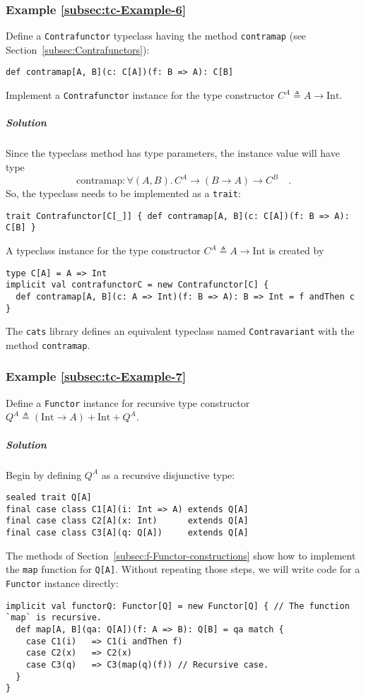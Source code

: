 \subsubsection{Example \label{subsec:tc-Example-6}\ref{subsec:tc-Example-6}}

Define a \lstinline!Contrafunctor! typeclass having the method \lstinline!contramap!
(see Section~\ref{subsec:Contrafunctors}):
\begin{lstlisting}
def contramap[A, B](c: C[A])(f: B => A): C[B]
\end{lstlisting}
Implement a \lstinline!Contrafunctor! instance for the type constructor
$C^{A}\triangleq A\rightarrow\text{Int}$.

\subparagraph{Solution}

Since the typeclass method has type parameters, the instance value
will have type
\[
\text{contramap}:\forall(A,B).\,C^{A}\rightarrow(B\rightarrow A)\rightarrow C^{B}\quad.
\]
So, the typeclass needs to be implemented as a \lstinline!trait!:
\begin{lstlisting}
trait Contrafunctor[C[_]] { def contramap[A, B](c: C[A])(f: B => A): C[B] }
\end{lstlisting}
A typeclass instance for the type constructor $C^{A}\triangleq A\rightarrow\text{Int}$
is created by
\begin{lstlisting}
type C[A] = A => Int
implicit val contrafunctorC = new Contrafunctor[C] {
  def contramap[A, B](c: A => Int)(f: B => A): B => Int = f andThen c
}
\end{lstlisting}

The \texttt{cats} library defines an equivalent typeclass named \lstinline!Contravariant!
with the method \lstinline!contramap!.

\subsubsection{Example \label{subsec:tc-Example-7}\ref{subsec:tc-Example-7}}

Define a \lstinline!Functor! instance for recursive type constructor
$Q^{A}\triangleq\left(\text{Int}\rightarrow A\right)+\text{Int}+Q^{A}$.

\subparagraph{Solution}

Begin by defining $Q^{A}$ as a recursive disjunctive type:
\begin{lstlisting}
sealed trait Q[A]
final case class C1[A](i: Int => A) extends Q[A]
final case class C2[A](x: Int)      extends Q[A]
final case class C3[A](q: Q[A])     extends Q[A]
\end{lstlisting}
The methods of Section~\ref{subsec:f-Functor-constructions} show
how to implement the \lstinline!map! function for \lstinline!Q[A]!.
Without repeating those steps, we will write code for a \lstinline!Functor!
instance directly:
\begin{lstlisting}
implicit val functorQ: Functor[Q] = new Functor[Q] { // The function `map` is recursive.
  def map[A, B](qa: Q[A])(f: A => B): Q[B] = qa match {
    case C1(i)   => C1(i andThen f)
    case C2(x)   => C2(x)
    case C3(q)   => C3(map(q)(f)) // Recursive case.
  }
}
\end{lstlisting}


